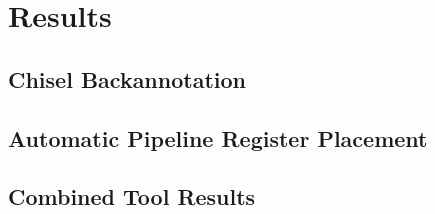 \section{Results}
\subsection{Chisel Backannotation}
\subsection{Automatic Pipeline Register Placement}
\subsection{Combined Tool Results}

